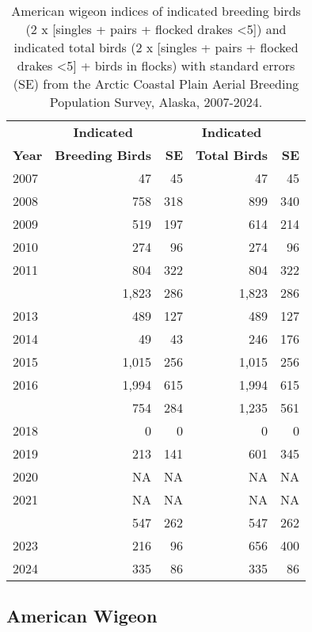 \documentclass[
]{article}
\begin{document}
\begin{longtable}[t]{lrrrr}

\caption{\label{tbl-AMWI}American wigeon indices of indicated breeding
birds (2 x {[}singles + pairs + flocked drakes \textless5{]}) and
indicated total birds (2 x {[}singles + pairs + flocked drakes
\textless5{]} + birds in flocks) with standard errors (SE) from the
Arctic Coastal Plain Aerial Breeding Population Survey, Alaska,
2007-2024.}

\tabularnewline

\\
\toprule
\multicolumn{1}{c}{\textbf{ }} & \multicolumn{1}{c}{\textbf{Indicated}} & \multicolumn{1}{c}{\textbf{ }} & \multicolumn{1}{c}{\textbf{Indicated}} & \multicolumn{1}{c}{\textbf{ }} \\
\cmidrule(l{3pt}r{3pt}){2-2} \cmidrule(l{3pt}r{3pt}){4-4}
\textbf{Year} & \textbf{Breeding Birds} & \textbf{SE} & \textbf{Total Birds} & \textbf{SE}\\
\midrule
2007 & 47 & 45 & 47 & 45\\
2008 & 758 & 318 & 899 & 340\\
2009 & 519 & 197 & 614 & 214\\
2010 & 274 & 96 & 274 & 96\\
2011 & 804 & 322 & 804 & 322\\
\addlinespace
2012 & 1,823 & 286 & 1,823 & 286\\
2013 & 489 & 127 & 489 & 127\\
2014 & 49 & 43 & 246 & 176\\
2015 & 1,015 & 256 & 1,015 & 256\\
2016 & 1,994 & 615 & 1,994 & 615\\
\addlinespace
2017 & 754 & 284 & 1,235 & 561\\
2018 & 0 & 0 & 0 & 0\\
2019 & 213 & 141 & 601 & 345\\
2020 & NA & NA & NA & NA\\
2021 & NA & NA & NA & NA\\
\addlinespace
2022 & 547 & 262 & 547 & 262\\
2023 & 216 & 96 & 656 & 400\\
2024 & 335 & 86 & 335 & 86\\
\bottomrule

\end{longtable}

\endgroup{}

\newpage{}

\subsection*{American Wigeon}\label{american-wigeon-2}
\end{document}
